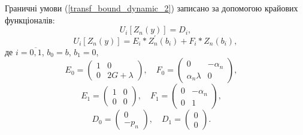 Граничні умови (\ref{transf_bound_dynamic_2}) записано за допомогою крайових функціоналів:
\begin{equation}\label{transf_bound_mat_dynamic_2}
    U_i\left[ Z_n(y) \right] = D_i,
\end{equation}
\begin{equation}\label{transf_bound_mat_detalization_dynamic_2}
    U_i\left[ Z_n(y) \right] = E_i * Z_n^{'}(b_i) + F_i * Z_n(b_i),
\end{equation}
де $i = \overline{0, 1}$, $b_0 = b$, $b_1 = 0$,
\begin{equation*}
    E_0 = \begin{pmatrix}
        1 & 0 \\
        0 & 2G + \lambda
    \end{pmatrix}, \quad
    F_0 = \begin{pmatrix}
        0 & -\alpha_n \\
        \alpha_n \lambda & 0
    \end{pmatrix}, \quad
\end{equation*}
\begin{equation*}
    E_1 = \begin{pmatrix}
        1 & 0 \\
        0 & 0
    \end{pmatrix}, \quad
    F_1 = \begin{pmatrix}
        0 & -\alpha_n \\
        0 & 1
    \end{pmatrix}, \quad
\end{equation*}
\begin{equation*}
    D_0 = \begin{pmatrix}
        0 \\
        -p_n
    \end{pmatrix}, \quad
    D_1 = \begin{pmatrix}
        0 \\
        0
    \end{pmatrix}. \quad
\end{equation*}

